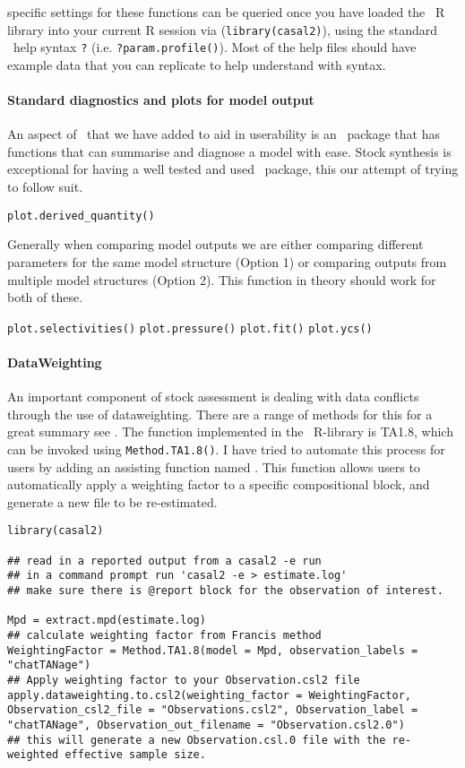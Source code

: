 specific settings for these functions can be queried once you have loaded the \CNAME\ R library into your current R session via (\texttt{library(casal2)}), using the standard \R\ help syntax \texttt{?} (i.e. \texttt{?param.profile()}). Most of the help files should have example data that you can replicate to help understand with syntax.
\\
\paragraph*{Standard diagnostics and plots for model output}
An aspect of \CNAME\ that we have added to aid in userability is an \R\ package that has functions that can summarise and diagnose a model with ease. Stock synthesis is exceptional for having a well tested and used \R\ package, this our attempt of trying to follow suit.

\texttt{plot.derived\_quantity()}


Generally when comparing model outputs we are either comparing different parameters for the same model structure (Option 1) or comparing outputs from multiple model structures (Option 2). This function in theory should work for both of these.

\texttt{plot.selectivities()}
\texttt{plot.pressure()}
\texttt{plot.fit()}
\texttt{plot.ycs()}

\paragraph*{DataWeighting}
An important component of stock assessment is dealing with data conflicts through the use of dataweighting. There are a range of methods for this for a great summary see \cite{francis2011data}. The function implemented in the \CNAME\ R-library is TA1.8, which can be invoked using \texttt{Method.TA1.8()}. I have tried to automate this process for users by adding an assisting function named . This function allows users to automatically apply a weighting factor to a specific compositional  block, and generate a new  file to be re-estimated.

\begin{lstlisting}
library(casal2)

## read in a reported output from a casal2 -e run
## in a command prompt run 'casal2 -e > estimate.log'
## make sure there is @report block for the observation of interest.

Mpd = extract.mpd(estimate.log)
## calculate weighting factor from Francis method
WeightingFactor = Method.TA1.8(model = Mpd, observation_labels = "chatTANage")
## Apply weighting factor to your Observation.csl2 file
apply.dataweighting.to.csl2(weighting_factor = WeightingFactor, Observation_csl2_file = "Observations.csl2", Observation_label = "chatTANage", Observation_out_filename = "Observation.csl2.0")
## this will generate a new Observation.csl.0 file with the re-weighted effective sample size.
\end{lstlisting}


